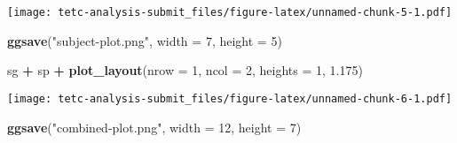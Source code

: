 \documentclass[]{article}
\newenvironment{Shaded}{\begin{snugshade}}{\end{snugshade}}
\newcommand{\KeywordTok}[1]{\textcolor[rgb]{0.13,0.29,0.53}{\textbf{#1}}}
\newcommand{\DataTypeTok}[1]{\textcolor[rgb]{0.13,0.29,0.53}{#1}}
\newcommand{\DecValTok}[1]{\textcolor[rgb]{0.00,0.00,0.81}{#1}}
\newcommand{\FloatTok}[1]{\textcolor[rgb]{0.00,0.00,0.81}{#1}}
\newcommand{\StringTok}[1]{\textcolor[rgb]{0.31,0.60,0.02}{#1}}
\newcommand{\OperatorTok}[1]{\textcolor[rgb]{0.81,0.36,0.00}{\textbf{#1}}}
\newcommand{\NormalTok}[1]{#1}
\begin{document}
\texttt{[image: tetc-analysis-submit\_files/figure-latex/unnamed-chunk-5-1.pdf]}

\begin{Shaded}
\begin{Highlighting}[]
\KeywordTok{ggsave}\NormalTok{(}\StringTok{"subject-plot.png"}\NormalTok{, }\DataTypeTok{width =} \DecValTok{7}\NormalTok{, }\DataTypeTok{height =} \DecValTok{5}\NormalTok{)}
\end{Highlighting}
\end{Shaded}

\begin{Shaded}
\begin{Highlighting}[]
\NormalTok{sg }\OperatorTok{+}\StringTok{ }\NormalTok{sp }\OperatorTok{+}\StringTok{ }\KeywordTok{plot_layout}\NormalTok{(}\DataTypeTok{nrow =} \DecValTok{1}\NormalTok{, }\DataTypeTok{ncol =} \DecValTok{2}\NormalTok{, }\DataTypeTok{heights =} \DecValTok{1}\NormalTok{, }\FloatTok{1.175}\NormalTok{)}
\end{Highlighting}
\end{Shaded}

\texttt{[image: tetc-analysis-submit\_files/figure-latex/unnamed-chunk-6-1.pdf]}

\begin{Shaded}
\begin{Highlighting}[]
\KeywordTok{ggsave}\NormalTok{(}\StringTok{"combined-plot.png"}\NormalTok{, }\DataTypeTok{width =} \DecValTok{12}\NormalTok{, }\DataTypeTok{height =} \DecValTok{7}\NormalTok{)}
\end{Highlighting}
\end{Shaded}
\end{document}
